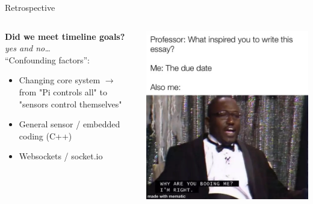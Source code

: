 \documentclass[aspectratio=169]{beamer}
\begin{document}
  \begin{frame}{\sectitle}{Retrospective}
    \begin{columns}
      \begin{column}{.5\textwidth}
        \textbf{Did we meet timeline goals?}\\\textit{yes and no\dots}\\
        \vspace*{1em}
        ``Confounding factors'':
        \begin{itemize}
          \item Changing core system $\rightarrow$ from "Pi controls all" to "sensors control themselves"
          \item General sensor / embedded coding (C++)
          \item Websockets / socket.io
        \end{itemize}
      \end{column}
      \begin{column}{.5\textwidth}
        \centering\includegraphics[scale=.25]{images/IMG_7529.png}
      \end{column}
    \end{columns}
  \end{frame}
\end{document}
